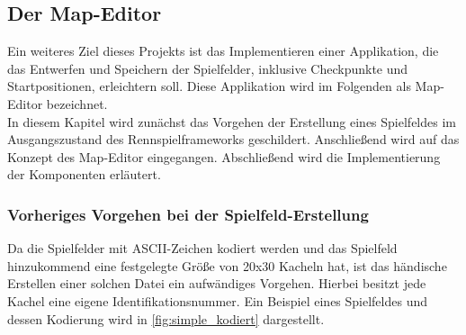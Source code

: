 \subsection{Der Map-Editor}
Ein weiteres Ziel dieses Projekts ist das Implementieren einer Applikation, die das Entwerfen und Speichern der Spielfelder, inklusive Checkpunkte und Startpositionen, erleichtern soll. Diese Applikation wird im Folgenden als Map-Editor bezeichnet.\\
In diesem Kapitel wird zunächst das Vorgehen der Erstellung eines Spielfeldes im Ausgangszustand des Rennspielframeworks geschildert. Anschließend wird auf das Konzept des Map-Editor eingegangen. Abschließend wird die Implementierung der Komponenten erläutert.\\

\subsubsection{Vorheriges Vorgehen bei der Spielfeld-Erstellung}
Da die Spielfelder mit ASCII-Zeichen kodiert werden und das Spielfeld hinzukommend eine festgelegte Größe von 20x30 Kacheln hat, ist das händische Erstellen einer solchen Datei ein aufwändiges Vorgehen. Hierbei besitzt jede Kachel eine eigene Identifikationsnummer. Ein Beispiel eines Spielfeldes und dessen Kodierung wird in \autoref{fig:simple_kodiert} dargestellt.\\

